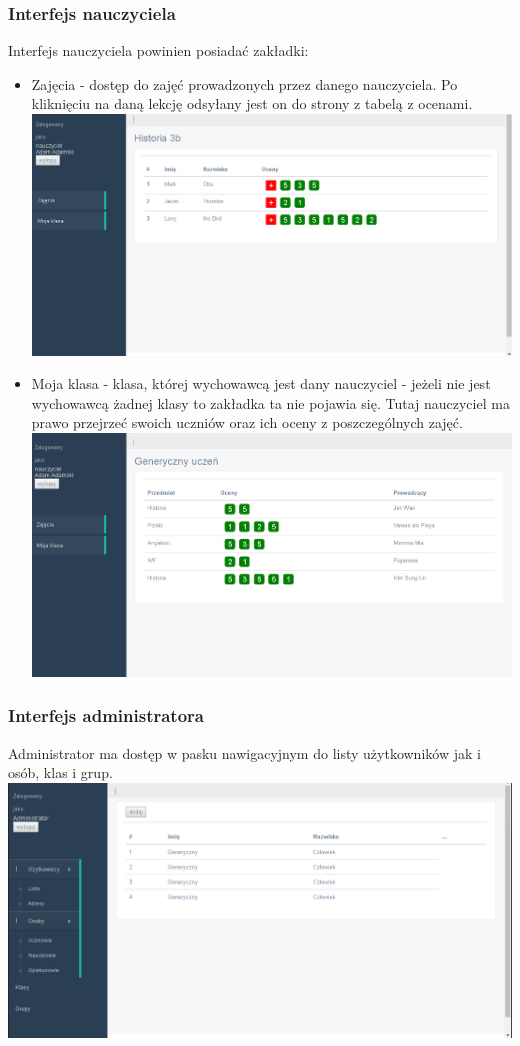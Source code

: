 \documentclass[12pt, titlepage]{article}
\begin{document}
\subsubsection{Interfejs nauczyciela}
Interfejs nauczyciela powinien posiadać zakładki:
\begin{itemize}
	\item Zajęcia - dostęp do zajęć prowadzonych przez danego nauczyciela. Po kliknięciu na daną lekcję odsyłany jest on do strony z tabelą z ocenami. 
\includegraphics[scale=0.4]{screeny/nauczyciel.png}
	\item Moja klasa - klasa, której wychowawcą jest dany nauczyciel - jeżeli nie jest wychowawcą żadnej klasy to zakładka ta nie pojawia się. Tutaj nauczyciel ma prawo przejrzeć swoich uczniów oraz ich oceny z poszczególnych zajęć. \\
\includegraphics[scale=0.4]{screeny/Oceny.png}
\end{itemize}

\subsubsection{Interfejs administratora}
Administrator ma dostęp w pasku nawigacyjnym do listy użytkowników jak i osób, klas i grup. \\
\includegraphics[scale=0.4]{screeny/admin.png}
\end{document}
